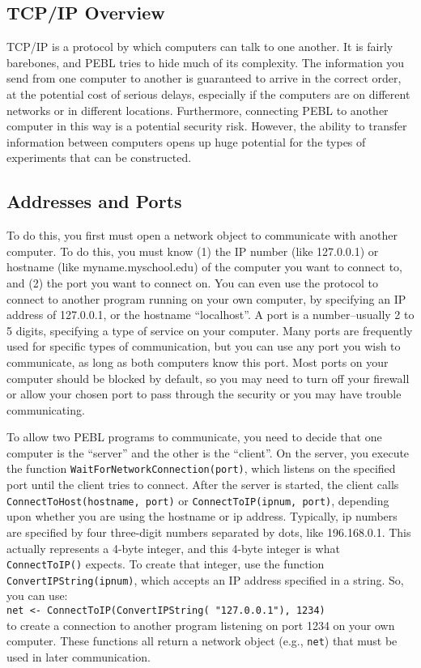 \subsection{TCP/IP Overview}
TCP/IP is a protocol by which computers can talk to one another.  It
is fairly barebones, and PEBL tries to hide much of its
complexity. The information you send from one computer to another is
guaranteed to arrive in the correct order, at the potential cost of
serious delays, especially if the computers are on different networks
or in different locations.  Furthermore, connecting PEBL to another
computer in this way is a potential security risk. However, the
ability to transfer information between computers opens up huge
potential for the types of experiments that can be constructed.

\subsection{Addresses and Ports}
To do this, you first must open a network object to communicate with
another computer.  To do this, you must know (1) the IP number (like
127.0.0.1) or hostname (like myname.myschool.edu) of the computer you
want to connect to, and (2) the port you want to connect on. You can even
use the protocol to connect to another program running on your own
computer, by specifying an IP address of 127.0.0.1, or the hostname
``localhost''.  A port is
a number--usually 2 to 5 digits, specifying a type of service
on your computer. Many ports are frequently used for specific types of
communication, but you can use any port you wish to communicate, as
long as both computers know this port. Most ports on your computer
should be blocked by default, so you may need to turn off your
firewall or allow your chosen port to pass through the security or you
may have trouble communicating.

To allow two PEBL programs to communicate, you need to decide that one
computer is the ``server'' and the other is the ``client''.  On the
server, you execute the function
\texttt{WaitForNetworkConnection(port)}, which listens on the
specified port until the client tries to connect.  After the server is
started, the client calls \texttt{ConnectToHost(hostname, port)} or
\texttt{ConnectToIP(ipnum, port)}, depending upon whether you are using the
hostname or ip address.  Typically, ip numbers are specified by four
three-digit numbers separated by dots, like 196.168.0.1. This actually
represents a 4-byte integer, and this 4-byte integer is what
\texttt{ConnectToIP()} expects.  To create that integer, use the
function \\ \texttt{ConvertIPString(ipnum)}, which accepts an IP address
specified in a string.  So, you can use:\\
\texttt{net <- ConnectToIP(ConvertIPString( "127.0.0.1"), 1234)}\\
to create a
connection to another program listening on port 1234 on your own
computer.  These functions all return a network object (e.g.,
\texttt{net}) that must be
used in later communication.

